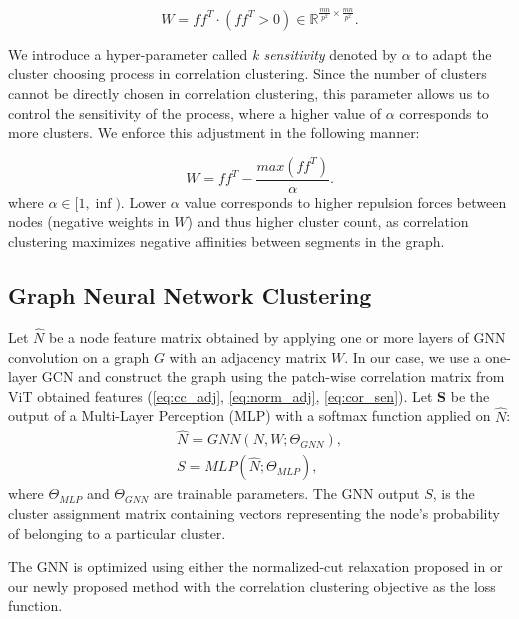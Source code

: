 \documentclass[10pt,twocolumn,letterpaper]{article}
\begin{document}
\begin{equation}
	W = ff^T \cdot(ff^T > 0) \in \mathbb{R}^{\frac{mn}{p^2} \times \frac{mn}{p^2}}.
  \label{eq:norm_adj}
\end{equation}

We introduce a hyper-parameter called \emph{k sensitivity} denoted by $\alpha$ to adapt the cluster choosing process in correlation clustering. Since the number of clusters cannot be directly chosen in correlation clustering, this parameter allows us to control the sensitivity of the process, where a higher value of $\alpha$ corresponds to more clusters. We enforce this adjustment in the following manner:

\begin{equation}
	W = ff^T - \frac{max(ff^T)}{\alpha}.
  \label{eq:cor_sen}
\end{equation}
where $\alpha \in [1, \inf)$. Lower $\alpha$ value corresponds to higher repulsion forces between nodes (negative weights in $W$) and thus higher cluster count, as correlation clustering maximizes negative affinities between segments in the graph.




\subsection{Graph Neural Network Clustering}\label{sec:gnn_clus}
Let \textbf{$\hat{N}$} be a node feature matrix obtained by applying one or more layers of GNN convolution on a graph $G$ with an adjacency matrix $W$. In our case, we use a one-layer GCN and construct the graph using the patch-wise correlation matrix from ViT obtained features (\cref{eq:cc_adj}, \cref{eq:norm_adj}, \cref{eq:cor_sen}).
Let \textbf{S} be the output of a Multi-Layer Perception (MLP) with a softmax function applied on \textbf{$\hat{N}$}:
\begin{equation}
\begin{gathered}
	\hat{N} = GNN(N , W; \Theta_{GNN}), \\ S = MLP({\hat{N}; \Theta_{MLP}}),
\end{gathered}
  \label{eq:gnn_cut}
\end{equation}
where $\Theta_{MLP}$ and $\Theta_{GNN}$ are trainable parameters. The GNN output $S$, is the cluster assignment matrix containing vectors representing the node's probability of belonging to a particular cluster.

The GNN is optimized using either the normalized-cut relaxation proposed in \cite{bianchi2020spectral} or our newly proposed method with the correlation clustering objective as the loss function.
\end{document}

